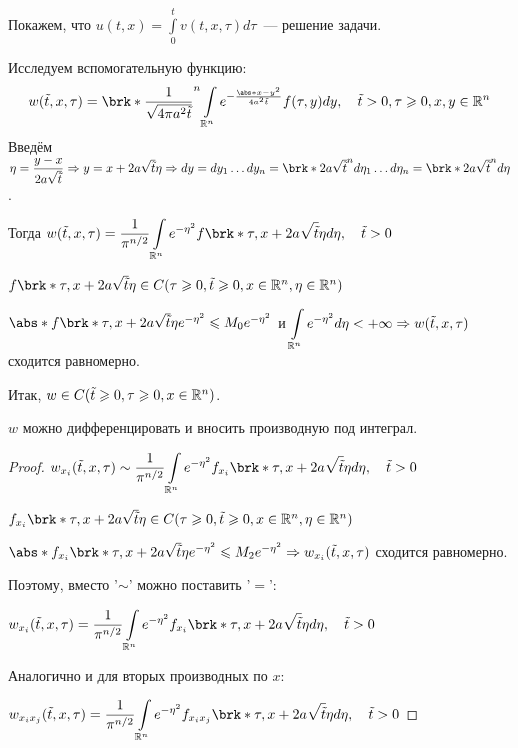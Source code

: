 Покажем, что $u(t,x) = \displaystyle\int\limits_0^t v(t,x,\tau)d\tau$~--- решение задачи.

Исследуем вспомогательную функцию:
\begin{equation*}
	w(\tilde{t}, x, \tau) = \brk*{\dfrac{1}{\sqrt{4\pi a^2\tilde{t}}}}^n \int\limits_{\R^n} e^{-\frac{\abs*{x-y}^2}{4a^2\tilde{t}}} f(\tau,y) dy, \quad \tilde{t} > 0, \tau \geqslant 0, x, y \in \R^n
\end{equation*}
Введём $\eta = \dfrac{y-x}{2a\sqrt{\tilde{t}}} \Rightarrow y = x + 2a\sqrt{\tilde{t}} \eta \Rightarrow dy = dy_1\ldots dy_n = \brk*{2a\sqrt{\tilde{t}}}^n d\eta_1\ldots d\eta_n = \brk*{2a\sqrt{\tilde{t}}}^n d\eta$.

Тогда $w(\tilde{t}, x, \tau) = \dfrac{1}{\pi^{n/2}} \displaystyle\int\limits_{\R^n} e^{-\eta^2} f\brk*{\tau, x+2a\sqrt{\tilde{t}}\eta}d\eta, \quad \tilde{t} > 0$

$f\brk*{\tau, x+2a\sqrt{\tilde{t}}\eta} \in C(\tau \geqslant 0, \tilde{t} \geqslant 0, x \in \R^n, \eta \in \R^n)$

$\abs*{f\brk*{\tau, x+2a\sqrt{\tilde{t}}\eta}e^{-\eta^2}} \leqslant M_0 e^{-\eta^2}$ и $\displaystyle\int\limits_{\mathbb{R}^n} e^{-\eta^2}d\eta <+\infty \Rightarrow w(\tilde{t}, x, \tau)$ сходится равномерно.

Итак, $w \in C(\tilde{t} \geqslant 0, \tau \geqslant 0, x \in \mathbb{R}^n)$.

\begin{statement}
	$w$ можно дифференцировать и вносить производную под интеграл.
\end{statement}

\begin{proof}
	$w_{x_i}(\tilde{t}, x, \tau) \sim \dfrac{1}{\pi^{n/2}} \displaystyle\int\limits_{\R^n} e^{-\eta^2} f_{x_i}\brk*{\tau, x+2a\sqrt{\tilde{t}}\eta}d\eta, \quad \tilde{t} > 0$

	$f_{x_i}\brk*{\tau, x+2a\sqrt{\tilde{t}}\eta} \in C(\tau \geqslant 0, \tilde{t} \geqslant 0, x \in \R^n, \eta \in \R^n)$

	$\abs*{f_{x_i}\brk*{\tau, x+2a\sqrt{\tilde{t}}\eta}e^{-\eta^2}} \leqslant M_2 e^{-\eta^2} \Rightarrow w_{x_i}(\tilde{t}, x, \tau)$ сходится равномерно.

	Поэтому, вместо '$\sim$' можно поставить '$=$':

	$w_{x_i}(\tilde{t}, x, \tau) = \dfrac{1}{\pi^{n/2}} \displaystyle\int\limits_{\R^n} e^{-\eta^2} f_{x_i}\brk*{\tau, x+2a\sqrt{\tilde{t}}\eta}d\eta, \quad \tilde{t} > 0$

	Аналогично и для вторых производных по $x$:

	$w_{x_ix_j}(\tilde{t}, x, \tau) = \dfrac{1}{\pi^{n/2}} \displaystyle\int\limits_{\R^n} e^{-\eta^2} f_{x_ix_j}\brk*{\tau, x+2a\sqrt{\tilde{t}}\eta} d\eta, \quad \tilde{t} > 0$
\end{proof}
	
